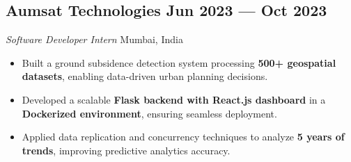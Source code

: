 \documentclass[a4,10pt]{article}
\newenvironment{zitemize}{
\begin{itemize}\itemsep0pt \parskip0pt \parsep1pt}
{\end{itemize}\vspace{-0.5cm}}
\begin{document}
\subsection*{Aumsat Technologies \hfill Jun 2023 --- Oct 2023}{\normalsize\normalfont \emph{Software Developer Intern}
\hfill Mumbai, India}
\vspace{-0.2cm}
\begin{zitemize}
    \item Built a ground subsidence detection system processing \textbf{500+ geospatial datasets}, enabling data-driven urban planning decisions.  
    \item Developed a scalable \textbf{Flask backend with React.js dashboard} in a \textbf{Dockerized environment}, ensuring seamless deployment.  
    \item Applied data replication and concurrency techniques to analyze \textbf{5 years of trends}, improving predictive analytics accuracy.  
\end{zitemize}
    
    
\end{document}
